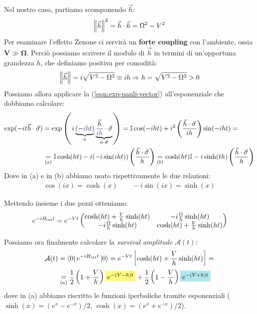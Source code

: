 \documentclass[../../InformazioneQuantistica.tex]{subfiles}
\begin{document}
Nel nostro caso, partiamo scomponendo $\vec{h}$:
\begin{align*}
\left\lVert\vec{h}\right\rVert^2={\vec{h}\cdot\vec{h}}=\Omega^2-V^2
\end{align*}
Per esaminare l'effetto Zenone ci servirà un \textbf{forte coupling} con l'ambiente, ossia $\bm{V\gg \Omega}$. Perciò possiamo scrivere il modulo di $\vec{h}$ in termini di un'opportuna grandezza $h$, che definiamo positiva per comodità:
\begin{align}
\left\lVert\vec{h}\right\rVert=i\sqrt{V^2-\Omega^2}\equiv ih \Rightarrow h=\sqrt{V^2-\Omega^2}>0
\label{eqn:h-def}
\end{align}
Possiamo allora applicare la (\ref{eqn:exp-pauli-vector}) all'esponenziale che dobbiamo calcolare:
\begin{align*}
\exp(-it\vec{h}\cdot \vec{\sigma})&=\exp\left(i\underbrace{(-\textcolor{Blue}{ih}t)}_{a} \underbrace{\frac{\vec{h}}{\textcolor{Blue}{ih}}\cdot \vec{\sigma}}_{\hat{n}\cdot\vec{\sigma}}\right) =
\bb{I}\cos(-iht) + i^2 \left(\frac{\vec{h}\cdot\vec{\sigma}}{ih}\right)\sin(-iht) =\\
&\underset{(a)}{=}\bb{I}\cosh(ht) -i(-i\sin(iht))\left(\frac{\vec{h}\cdot\vec{\sigma}}{h}\right) \underset{(b)}{=} \cosh(ht)\bb{I} - i\sinh(th) \left(\frac{\vec{h}\cdot\vec{\sigma}}{h}\right)
\end{align*}
Dove in (a) e in (b) abbiamo usato rispettivamente le due relazioni:
\begin{align*}
\cos(ix) = \cosh(x) \qquad -i\sin(ix) = \sinh(x)
\end{align*}

Mettendo insieme i due pezzi otteniamo:
\begin{align*}
e^{-iH_{\operatorname{int}}t}=e^{-Vt}\begin{pmatrix}
\cosh(ht) + \frac{V}{h}\sinh(ht) & -i\frac{\Omega}{h}\sinh(ht)\\
-i\frac{\Omega}{h}\sinh(ht) & \cosh(ht) +\frac{V}{h}\sinh(ht)
\end{pmatrix}
\end{align*}

Possiamo ora finalmente calcolare la \textit{survival amplitude} $\mathcal{A}(t)$:
\begin{align*}
\mathcal{A}(t) &= \bra{0}e^{-iH_{\op{int}}t}\ket{0} = e^{-Vt}\left[\cosh(ht) + \frac{V}{h}\sinh(ht)\right]=\\
&\underset{(a)}{=} \frac{1}{2}\left(1+\frac{V}{h}\right) \hlc{Yellow}{e^{-(V-h)t} }+\frac{1}{2}\left(1-\frac{V}{h}\right) \hlc{SkyBlue}{e^{-(V+h)t}}
\end{align*}
dove in (a) abbiamo riscritto le funzioni iperboliche tramite esponenziali ($\sinh(x)=(e^{x}-e^{-x})/2$, $\cosh(x)=(e^{x}+e^{-x})/2$).\\
\end{document}
